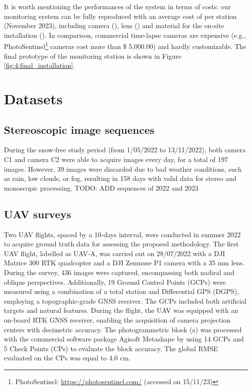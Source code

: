 It is worth mentioning the performances of the system in terms of costs: our  monitoring
system can be fully reproduced with an average cost of  per station
(November 2023), including camera (), lens () and material for
the on-site installation ().
In comparison, commercial time-lapse cameras are expensive
(e.g., PhotoSentinel\footnote{PhotoSentinel: \url{https://photosentinel.com/} (accessed
  on 15/11/23)} cameras cost more than \$ 5,000.00) and hardly customizable.
The final prototype of the monitoring station is shown in Figure
\ref{fig:4:final_installation}.

\section{Datasets}\label{sec:4:datasets}

\subsection{Stereoscopic image sequences}\label{sec:4:stereo}

During the snow-free study period (from 1/05/2022 to 13/11/2022), both camera C1 and
camera C2 were able to acquire images every day, for a total of 197 images. However, 39
images were discarded due to bad weather conditions, such as rain, low clouds, or fog,
resulting in 158 days with valid data for stereo and monoscopic processing.
{\color{red} TODO: ADD sequences of 2022 and 2023}

\subsection{UAV surveys}\label{sec:4:uavsurveys}

Two UAV flights, spaced by a 10-days interval, were conducted in summer 2022 to acquire
ground truth data for assessing the proposed methodology.
The first UAV flight, labelled as UAV-A, was carried out on 28/07/2022 with a DJI
Matrice 300 RTK quadcopter and a DJI Zenmuse P1 camera with a 35 mm lens.
During the survey, 436 images were captured, encompassing both nadiral and oblique
perspectives.
Additionally, 19 Ground Control Points (GCPs) were measured using a combination of a
total station and Differential GPS (DGPS), employing a topographic-grade
GNSS receiver.
The GCPs included both artificial targets and natural features.
During the flight, the UAV was equipped with an on-board RTK GNSS receiver, enabling the
acquisition of camera projection centers with decimetric accuracy.
The photogrammetric block (a) was processed with the commercial
software package Agisoft Metashape \citep{agisoft} by using 14 GCPs and 5 Check Points
(CPs) to evaluate the block accuracy.
The global RMSE evaluated on the CPs was equal to 4.0 cm.

